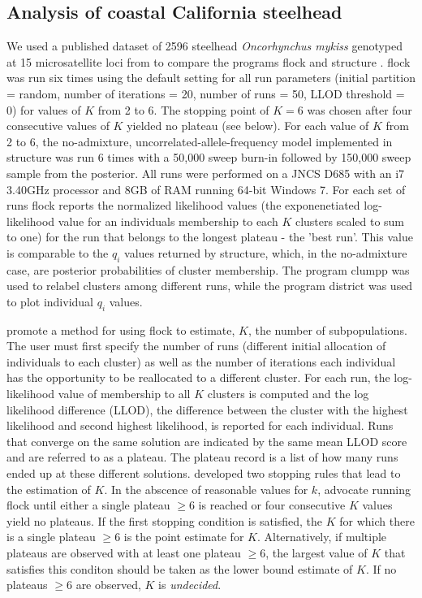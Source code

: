 \subsection*{Analysis of coastal California steelhead} 
We used a published dataset of 2596 steelhead \textit{Oncorhynchus mykiss}
genotyped at 15 microsatellite loci from \citet{Garzaetal_norcal} to compare the programs
{\sc flock} and {\sc structure} .  {\sc flock} 
was run six times using the default setting for all 
run parameters (initial partition = random, number of iterations = 20, number of runs = 50, 
LLOD threshold = 0) for values of $K$ from 2 to 6. The stopping point of 
$K=6$ was chosen after four consecutive values of $K$
yielded no plateau (see below). For each value of $K$ from 2 to 6, the no-admixture, 
uncorrelated-allele-frequency model implemented in {\sc structure} was run 6 times with 
a 50,000 sweep burn-in followed by 150,000 sweep sample from the posterior. 
All runs were performed on a JNCS D685 with an i7 3.40GHz processor and 8GB
of RAM running 64-bit Windows 7. For each set of runs {\sc flock} reports the 
normalized likelihood values (the exponenetiated log-likelihood value for an individuals 
membership to each $K$ clusters scaled to sum to one) for the run that belongs to 
the longest plateau - the 'best run'. 
This value is comparable to the $q_i$ values
returned by {\sc structure}, which, in the no-admixture case, are posterior probabilities of cluster membership.
The program {\sc clumpp} \citep{Jak&Ros2007} was used to relabel clusters among different runs,
while the program {\sc district} \citep{Rosenberg2004} was used to plot individual \textit{$q_i$} values. 

\citet{Duc&Tur2012} promote a method for using {\sc flock} to estimate, $K$, the number of
subpopulations. The user must first specify the number of runs (different initial allocation of individuals 
to each cluster) as well as the number of iterations each individual has the opportunity to be reallocated 
to a different cluster. For each run, the log-likelihood value of membership to all $K$ clusters is computed
and the log likelihood difference (LLOD), the difference between the cluster with the highest likelihood 
and second highest likelihood, is reported for each individual. Runs that converge on the same solution 
are indicated by the same mean LLOD score and 
are referred to as a plateau. The plateau record is a list of how many runs ended up at these different solutions. 
\citet{Duc&Tur2012} developed two stopping rules that lead to the estimation of $K$. In the abscence of 
reasonable values for $k$, \citet{Duc&Tur2012} advocate running  {\sc flock} until either a single plateau 
$\geq 6$  is reached or four consecutive $K$ values yield no plateaus. If the first stopping condition is satisfied,
the $K$ for which there is a single plateau $\geq 6$ is the point estimate for $K$. Alternatively, 
if multiple plateaus are observed with at least one plateau $\geq 6$, the largest value of $K$ that satisfies 
this conditon should be taken as the lower bound estimate of $K$. If no plateaus $\geq 6$ are observed, $K$
is \textit{undecided}.  


